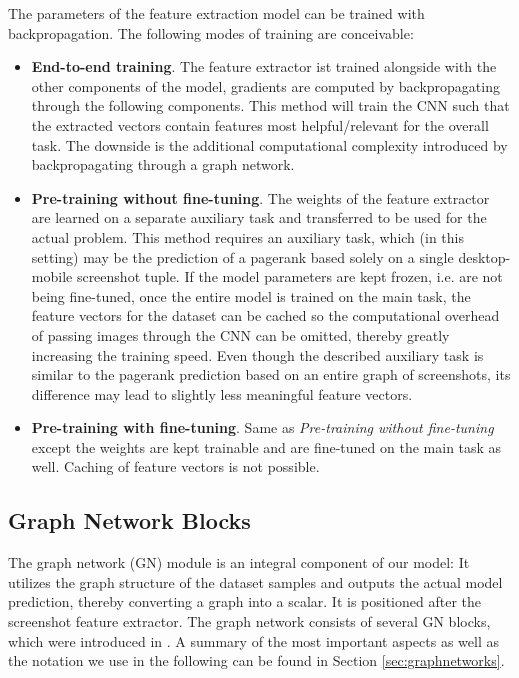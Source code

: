 The parameters of the feature extraction model can be trained with backpropagation. The following modes of training are conceivable:
\begin{itemize}
    \item \textbf{End-to-end training}. The feature extractor ist trained alongside with the other components of the model, gradients are computed by backpropagating through the following components. This method will train the CNN such that the extracted vectors contain features most helpful/relevant for the overall task. The downside is the additional computational complexity introduced by backpropagating through a graph network.
    \item \textbf{Pre-training without fine-tuning}. The weights of the feature extractor are learned on a separate auxiliary task and transferred to be used for the actual problem. This method requires an auxiliary task, which (in this setting) may be the prediction of a pagerank based solely on a single desktop-mobile screenshot tuple. If the model parameters are kept frozen, i.e. are not being fine-tuned, once the entire model is trained on the main task, the feature vectors for the dataset can be cached so the computational overhead of passing images through the CNN can be omitted, thereby greatly increasing the training speed. Even though the described auxiliary task is similar to the pagerank prediction based on an entire graph of screenshots, its difference may lead to slightly less meaningful feature vectors.
    \item \textbf{Pre-training with fine-tuning}. Same as \textit{Pre-training without fine-tuning} except the weights are kept trainable and are fine-tuned on the main task as well. Caching of feature vectors is not possible.
\end{itemize}

\subsection{Graph Network Blocks}

The graph network (GN) module is an integral component of our model: It utilizes the graph structure of the dataset samples and outputs the actual model prediction, thereby converting a graph into a scalar. It is positioned after the screenshot feature extractor. The graph network consists of several GN blocks, which were introduced in \cite{deepmind:graphnets}. A summary of the most important aspects as well as the notation we use in the following can be found in Section \ref{sec:graphnetworks}.

